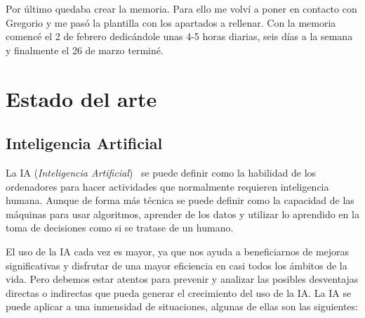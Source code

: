 \documentclass[a4paper, 12pt]{book}
\begin{document}
Por último quedaba crear la memoria. Para ello me volví a poner en contacto con Gregorio y me pasó la plantilla con los apartados a rellenar. Con la memoria comencé el 2 de febrero dedicándole unas 4-5 horas diarias, seis días a la semana y finalmente el 26 de marzo terminé.


\cleardoublepage
\chapter{Estado del arte}
\label{chap:estado}

\section{Inteligencia Artificial} 
\label{sec:InteligenciaArtificial}

La IA (\emph{Inteligencia Artificial})~\cite{rouhiainen2018inteligencia} se puede definir como la habilidad de los ordenadores para hacer actividades que normalmente requieren inteligencia humana. 
Aunque de forma más técnica se puede definir como la capacidad de las máquinas para usar algoritmos, aprender de los datos y utilizar lo aprendido en la toma de decisiones como si se tratase de un humano.

El uso de la IA cada vez es mayor, ya que nos ayuda a beneficiarnos de mejoras significativas y disfrutar de una mayor eficiencia en casi todos los ámbitos de la vida. 
Pero debemos estar atentos para prevenir y analizar las posibles desventajas directas o indirectas que pueda generar el crecimiento del uso de la IA. 
La IA se puede aplicar a una inmensidad de situaciones, algunas de ellas son las siguientes:
\end{document}
